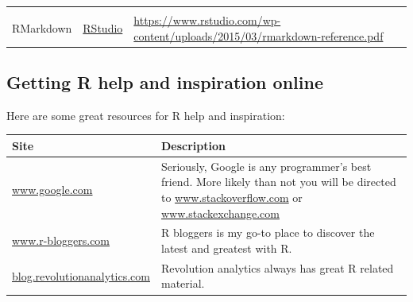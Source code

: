 \documentclass[
]{book}
\begin{document}
\begin{longtable}[]{@{}lll@{}}
\begin{minipage}[t]{0.36\columnwidth}
\end{minipage}\tabularnewline
\begin{minipage}[t]{0.37\columnwidth}\raggedright
RMarkdown\strut
\end{minipage} & \begin{minipage}[t]{0.18\columnwidth}\raggedright
\href{https://www.rstudio.com}{RStudio}\strut
\end{minipage} & \begin{minipage}[t]{0.36\columnwidth}\raggedright
\url{https://www.rstudio.com/wp-content/uploads/2015/03/rmarkdown-reference.pdf}\strut
\end{minipage}\tabularnewline
\bottomrule
\end{longtable}

\hypertarget{getting-r-help-and-inspiration-online}{%
\subsection{Getting R help and inspiration online}\label{getting-r-help-and-inspiration-online}}

Here are some great resources for R help and inspiration:

\begin{longtable}[]{@{}ll@{}}
\toprule
\begin{minipage}[b]{0.42\columnwidth}\raggedright
Site\strut
\end{minipage} & \begin{minipage}[b]{0.52\columnwidth}\raggedright
Description\strut
\end{minipage}\tabularnewline
\midrule
\endhead
\begin{minipage}[t]{0.42\columnwidth}\raggedright
\href{http://www.google.com}{www.google.com}\strut
\end{minipage} & \begin{minipage}[t]{0.52\columnwidth}\raggedright
Seriously, Google is any programmer's best friend. More likely than not you will be directed to \url{www.stackoverflow.com} or \url{www.stackexchange.com}\strut
\end{minipage}\tabularnewline
\begin{minipage}[t]{0.42\columnwidth}\raggedright
\href{http://www.r-bloggers.com}{www.r-bloggers.com}\strut
\end{minipage} & \begin{minipage}[t]{0.52\columnwidth}\raggedright
R bloggers is my go-to place to discover the latest and greatest with R.\strut
\end{minipage}\tabularnewline
\begin{minipage}[t]{0.42\columnwidth}\raggedright
\href{http://blog.revolutionanalytics.com}{blog.revolutionanalytics.com}\strut
\end{minipage} & \begin{minipage}[t]{0.52\columnwidth}\raggedright
Revolution analytics always has great R related material.\strut
\end{minipage}\tabularnewline
\bottomrule
\end{longtable}
\end{document}
